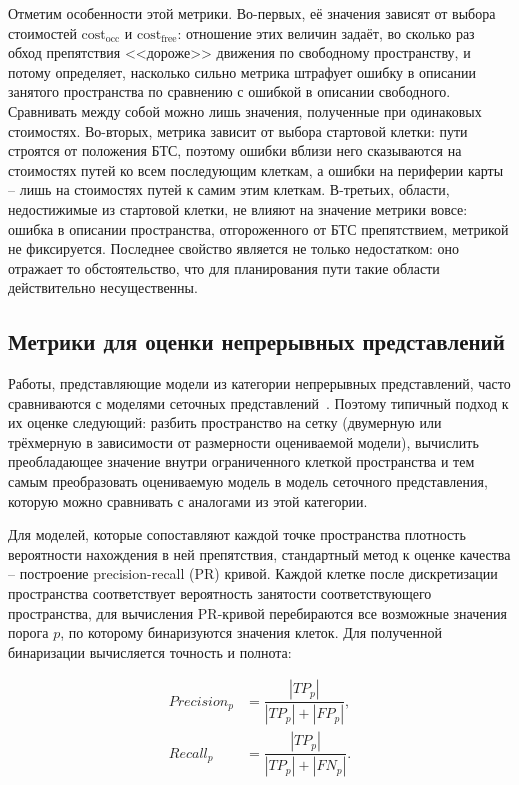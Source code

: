 Отметим особенности этой метрики. Во-первых, её значения зависят от выбора стоимостей $\text{cost}_\text{occ}$ и $\text{cost}_\text{free}$: отношение этих величин задаёт, во сколько раз обход препятствия <<дороже>> движения по свободному пространству, и потому определяет, насколько сильно метрика штрафует ошибку в описании занятого пространства по сравнению с ошибкой в описании свободного. Сравнивать между собой можно лишь значения, полученные при одинаковых стоимостях. Во-вторых, метрика зависит от выбора стартовой клетки: пути строятся от положения БТС, поэтому ошибки вблизи него сказываются на стоимостях путей ко всем последующим клеткам, а ошибки на периферии карты -- лишь на стоимостях путей к самим этим клеткам. В-третьих, области, недостижимые из стартовой клетки, не влияют на значение метрики вовсе: ошибка в описании пространства, отгороженного от БТС препятствием, метрикой не фиксируется. Последнее свойство является не только недостатком: оно отражает то обстоятельство, что для планирования пути такие области действительно несущественны.

\subsection{Метрики для оценки непрерывных представлений}

Работы, представляющие модели из категории непрерывных представлений, часто сравниваются с моделями сеточных представлений~\cite{Li2024, o2011continuous, 7487235}. Поэтому типичный подход к их оценке следующий: разбить пространство на сетку (двумерную или трёхмерную в зависимости от размерности оцениваемой модели), вычислить преобладающее значение внутри ограниченного клеткой пространства и тем самым преобразовать оцениваемую модель в модель сеточного представления, которую можно сравнивать с аналогами из этой категории. 

Для моделей, которые сопоставляют каждой точке пространства плотность вероятности нахождения в ней препятствия, стандартный метод к оценке качества -- построение precision-recall (PR) кривой. Каждой клетке после дискретизации пространства соответствует вероятность занятости соответствующего пространства, для вычисления PR-кривой перебираются все возможные значения порога $p$, по которому бинаризуются значения клеток. Для полученной бинаризации вычисляется точность и полнота:

\begin{align}
	Precision_p &= \dfrac{|TP_p|}{|TP_p| + |FP_p|},\label{eq:precision}\\
	Recall_p &= \dfrac{|TP_p|}{|TP_p| + |FN_p|}.\label{eq:recall}
\end{align}

